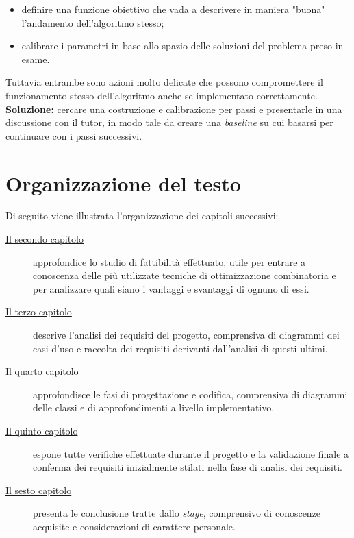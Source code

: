 \begin{enumerate}
    \begin{itemize}
        \item definire una funzione obiettivo che vada a descrivere in maniera "buona" l'andamento dell'algoritmo stesso;
        \item calibrare i parametri in base allo spazio delle soluzioni del problema preso in esame.
    \end{itemize}
    Tuttavia entrambe sono azioni molto delicate che possono compromettere il funzionamento stesso dell'algoritmo anche
    se implementato correttamente.\\[0.2cm]
    \textbf{Soluzione:} cercare una costruzione e calibrazione per passi e presentarle in una discussione con il tutor,
    in modo tale da creare una \textit{baseline} su cui basarsi per continuare con i passi successivi.


\end{enumerate}

\noindent
\section{Organizzazione del testo}
\noindent Di seguito viene illustrata l'organizzazione dei capitoli successivi:
\begin{description}
    \item[{\hyperref[cap:studio-fattibilita]{Il secondo capitolo}}] 
    approfondice lo studio di fattibilità effettuato, utile per entrare a conoscenza
    delle più utilizzate tecniche di ottimizzazione combinatoria e per analizzare
    quali siano i vantaggi e svantaggi di ognuno di essi.
    
    \item[{\hyperref[cap:analisi-requisiti]{Il terzo capitolo}}]
    descrive l'analisi dei requisiti del progetto, comprensiva di diagrammi dei
    casi d'uso e raccolta dei requisiti derivanti dall'analisi di questi ultimi.
    
    \item[{\hyperref[cap:progettazione-codifica]{Il quarto capitolo}}]
    approfondisce le fasi di progettazione e codifica, comprensiva di diagrammi delle classi
    e di approfondimenti a livello implementativo.
    
    \item[{\hyperref[cap:verifica-validazione]{Il quinto capitolo}}]
    espone tutte verifiche effettuate durante il progetto e la validazione
    finale a conferma dei requisiti inizialmente stilati nella fase di
    analisi dei requisiti.
    
    \item[{\hyperref[cap:conclusioni]{Il sesto capitolo}}]
    presenta le conclusione tratte dallo \textit{stage}, comprensivo di conoscenze
    acquisite e considerazioni di carattere personale.
\end{description}

